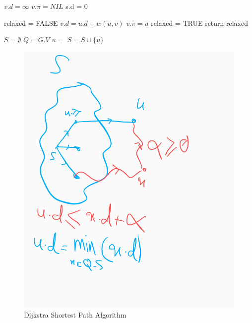 \documentclass{book}
\begin{document}
	
		\begin{algorithm*}[h!]
			\begin{algorithmic}[1]
						\State $v.d = \infty$
						\State $v.\pi = NIL$
					\EndFor
					\State s.d = 0
				\EndFunction
			\end{algorithmic}
			
			\begin{algorithmic}[1]
					\State relaxed = FALSE
						\State $v.d = u.d + w(u, v)$
						\State $v.\pi = u$
						\State relaxed = TRUE
					\EndIf
					\State return relaxed
				\EndFunction
			\end{algorithmic}
	
			\begin{algorithmic}[1]
					\State {}
					\State $S = \emptyset$
					\State $Q = G.V$
					\While{$Q \ne \emptyset$}
						\State $u=$ 
						\State $S = S \cup \{u\}$
							\State {}
						\EndFor
					\EndWhile
				\EndFunction
			\end{algorithmic}		
		\end{algorithm*}
		\FloatBarrier
	
	\begin{figure}
	\centering
	\caption{Dijkstra Shortest Path Algorithm}
	\label{fig:dijkstra-shortest-path-algorithm}
	\includegraphics[width=\linewidth]{images/dijkstra-shortest-path.jpg}
	\end{figure}
	\FloatBarrier
\end{document}
